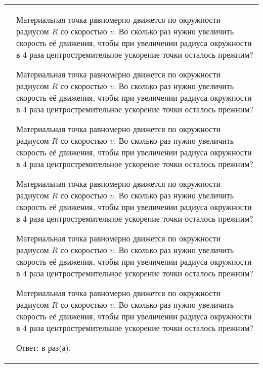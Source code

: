 \documentclass[10pt,a4paper,twocolumn,landscape]{article}
\newcommand{\createtask}[2]{
	\hspace{-1.3cm}
	\begin{tabular}{c l}
		\framebox[0.85cm]{\textbf{#1}}\hspace{-0.15cm} &
		\begin{minipage}[t]{11.25cm}
			#2
		\end{minipage}
	\end{tabular}
}
\newcommand{\blankanswer}{ \underline{\hspace{4.5cm}} }
\newcommand{\separ}{\vspace{1cm}}
\newcommand{\sepline}{\vspace{1em}}
\begin{document}
\createtask{21}{
	Материальная точка равномерно движется по окружности радиусом $R$
	со скоростью $v$. Во сколько раз нужно увеличить скорость её движения,
	чтобы при увеличении радиуса окружности в 4 раза центростремительное
	ускорение точки осталось прежним?

	Материальная точка равномерно движется по окружности радиусом $R$
	со скоростью $v$. Во сколько раз нужно увеличить скорость её движения,
	чтобы при увеличении радиуса окружности в 4 раза центростремительное
	ускорение точки осталось прежним?

	Материальная точка равномерно движется по окружности радиусом $R$
	со скоростью $v$. Во сколько раз нужно увеличить скорость её движения,
	чтобы при увеличении радиуса окружности в 4 раза центростремительное
	ускорение точки осталось прежним?

	Материальная точка равномерно движется по окружности радиусом $R$
	со скоростью $v$. Во сколько раз нужно увеличить скорость её движения,
	чтобы при увеличении радиуса окружности в 4 раза центростремительное
	ускорение точки осталось прежним?

	Материальная точка равномерно движется по окружности радиусом $R$
	со скоростью $v$. Во сколько раз нужно увеличить скорость её движения,
	чтобы при увеличении радиуса окружности в 4 раза центростремительное
	ускорение точки осталось прежним?
	
	Материальная точка равномерно движется по окружности радиусом $R$
	со скоростью $v$. Во сколько раз нужно увеличить скорость её движения,
	чтобы при увеличении радиуса окружности в 4 раза центростремительное
	ускорение точки осталось прежним?

	\sepline
	Ответ: в \blankanswer раз(а).
}
\separ
\end{document}

